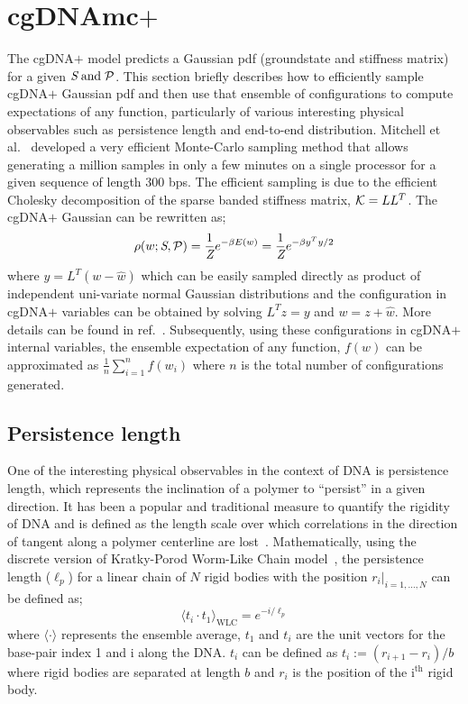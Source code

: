 \section{cgDNAmc$+$}\label{c2:sec6}
The cgDNA$+$ model predicts a Gaussian pdf (groundstate and stiffness matrix) for a given ${\textit{S}} {\;\text{and\;}} {\mathcal P}$.
This section briefly describes how to efficiently sample cgDNA$+$ Gaussian pdf and then use that ensemble of configurations to compute expectations of any function, particularly of various interesting physical observables such as persistence length and end-to-end distribution. 
Mitchell et al.~\cite{cgdnamc} developed a very efficient Monte-Carlo sampling method that allows generating a million samples in only a few minutes on a single processor for a given sequence of length 300 bps. 
The efficient sampling is due to the efficient Cholesky decomposition of the sparse banded stiffness matrix, ${\mathcal K}=LL^T$. 
The cgDNA$+$ Gaussian can be rewritten as; 
\begin{equation}
\rho(w; {\textit{S}}, \mathcal{P}) 
= \frac{1}{\textit{Z}} e^{-\beta E(w)}
= \frac{1}{\textit{Z}} e^{-\beta y^Ty/2}
\label{c2:eq_mc}
\end{equation}
where $y=L^T(w-\hat{w})$ which can be easily sampled directly as product of independent uni-variate normal Gaussian distributions and the configuration in cgDNA$+$ variables can be obtained by solving $L^Tz=y$ and $w = z + \hat{w}$. 
More details can be found in ref.~\cite{cgdnamc}. 
Subsequently, using these configurations in cgDNA$+$ internal variables, the ensemble expectation of any function, $f(w)$ can be approximated as $\frac{1}{n}\sum_{i=1}^nf(w_i)$ where $n$ is the total number of configurations generated.

\subsection{Persistence length}\label{c2:s6sb1}
One of the interesting physical observables in the context of DNA is persistence length, which represents the inclination of a polymer to \enquote{persist} in a given direction.
It has been a popular and traditional measure to quantify the rigidity of DNA and is defined as the length scale over which correlations in the direction of tangent along a polymer centerline are lost~\cite{hagerman1988flexibility}. 
Mathematically, using the discrete version of Kratky-Porod Worm-Like Chain model~\cite{kratky1949}, the persistence length ($\ell_p$) for a linear chain of $N$ rigid bodies with the position $r_i|_{i=1,...,N}$ can be defined as; 
\begin{equation}
\langle t_i \cdot t_1  \rangle_{\text{WLC}} = e^{-i/\ell_p}
\label{c2:eq_persis}
\end{equation}
where $\langle \cdot  \rangle$ represents the ensemble average, $t_1$ and $t_i$ are the unit vectors for the base-pair index 1 and i along the DNA. 
$t_i$ can be defined as $t_i := (r_{i+1}-r_i)/b$ where rigid bodies are separated at length $b$ and $r_i$ is the position of the i$^\text{th}$ rigid body.

